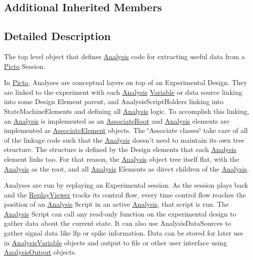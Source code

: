 \subsection*{Additional Inherited Members}


\subsection{Detailed Description}
The top level object that defines \hyperlink{class_picto_1_1_analysis}{Analysis} code for extracting useful data from a \hyperlink{namespace_picto}{Picto} Session. 

In \hyperlink{namespace_picto}{Picto}, Analyses are conceptual layers on top of an Experimental Design. They are linked to the experiment with each \hyperlink{class_picto_1_1_analysis}{Analysis} \hyperlink{class_picto_1_1_variable}{Variable} or data source linking into some Design Element parent, and Analysis\-Script\-Holders linking into State\-Machine\-Elements and defining all \hyperlink{class_picto_1_1_analysis}{Analysis} logic. To accomplish this linking, an \hyperlink{class_picto_1_1_analysis}{Analysis} is implemented as an \hyperlink{class_picto_1_1_associate_root}{Associate\-Root} and \hyperlink{class_picto_1_1_analysis}{Analysis} elements are implemented as \hyperlink{class_picto_1_1_associate_element}{Associate\-Element} objects. The \char`\"{}\-Associate classes\char`\"{} take care of all of the linkage code such that the \hyperlink{class_picto_1_1_analysis}{Analysis} doesn't need to maintain its own tree structure. The structure is defined by the Design elements that each \hyperlink{class_picto_1_1_analysis}{Analysis} element links too. For that reason, the \hyperlink{class_picto_1_1_analysis}{Analysis} object tree itself flat, with the \hyperlink{class_picto_1_1_analysis}{Analysis} as the root, and all \hyperlink{class_picto_1_1_analysis}{Analysis} Elements as direct children of the \hyperlink{class_picto_1_1_analysis}{Analysis}.

Analyses are run by replaying an Experimental session. As the session plays back and the \hyperlink{class_replay_viewer}{Replay\-Viewer} tracks its control flow, every time control flow reaches the position of an \hyperlink{class_picto_1_1_analysis}{Analysis} Script in an active \hyperlink{class_picto_1_1_analysis}{Analysis}, that script is run. The \hyperlink{class_picto_1_1_analysis}{Analysis} Script can call any read-\/only function on the experimental design to gather data about the current state. It can also use Analysis\-Data\-Sources to gather signal data like lfp or spike information. Data can be stored for later use in \hyperlink{class_picto_1_1_analysis_variable}{Analysis\-Variable} objects and output to file or other user interface using \hyperlink{class_picto_1_1_analysis_output}{Analysis\-Output} objects.

